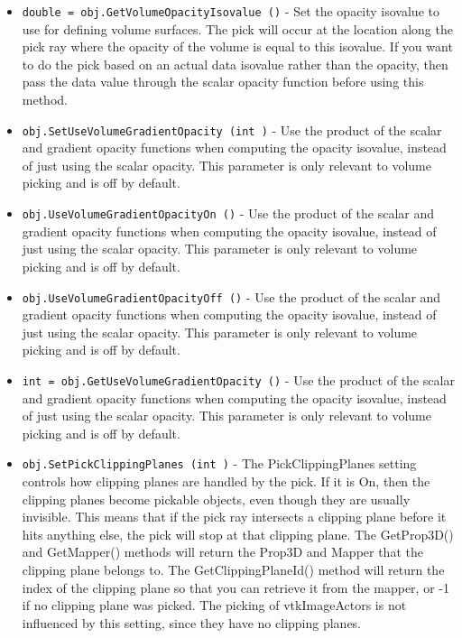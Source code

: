 \begin{itemize}
\item  \verb|double = obj.GetVolumeOpacityIsovalue ()| -  Set the opacity isovalue to use for defining volume surfaces.  The
 pick will occur at the location along the pick ray where the 
 opacity of the volume is equal to this isovalue.  If you want to do
 the pick based on an actual data isovalue rather than the opacity,
 then pass the data value through the scalar opacity function before
 using this method.

\item  \verb|obj.SetUseVolumeGradientOpacity (int )| -  Use the product of the scalar and gradient opacity functions when
 computing the opacity isovalue, instead of just using the scalar
 opacity. This parameter is only relevant to volume picking and
 is off by default.

\item  \verb|obj.UseVolumeGradientOpacityOn ()| -  Use the product of the scalar and gradient opacity functions when
 computing the opacity isovalue, instead of just using the scalar
 opacity. This parameter is only relevant to volume picking and
 is off by default.

\item  \verb|obj.UseVolumeGradientOpacityOff ()| -  Use the product of the scalar and gradient opacity functions when
 computing the opacity isovalue, instead of just using the scalar
 opacity. This parameter is only relevant to volume picking and
 is off by default.

\item  \verb|int = obj.GetUseVolumeGradientOpacity ()| -  Use the product of the scalar and gradient opacity functions when
 computing the opacity isovalue, instead of just using the scalar
 opacity. This parameter is only relevant to volume picking and
 is off by default.

\item  \verb|obj.SetPickClippingPlanes (int )| -  The PickClippingPlanes setting controls how clipping planes are
 handled by the pick.  If it is On, then the clipping planes become
 pickable objects, even though they are usually invisible.  This
 means that if the pick ray intersects a clipping plane before it
 hits anything else, the pick will stop at that clipping plane.
 The GetProp3D() and GetMapper() methods will return the Prop3D
 and Mapper that the clipping plane belongs to.  The
 GetClippingPlaneId() method will return the index of the clipping
 plane so that you can retrieve it from the mapper, or -1 if no
 clipping plane was picked. The picking of vtkImageActors is not
 influenced by this setting, since they have no clipping planes.


\end{itemize}

